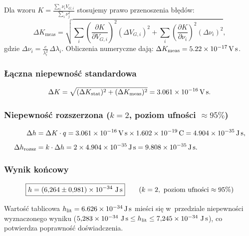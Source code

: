 \documentclass[a4paper,12pt]{article}
\begin{document}
Dla wzoru $K = \frac{\sum_i \nu_i V_{G,i}}{\sum_i \nu_j^2}$ stosujemy prawo przenoszenia błędów:
\begin{equation}
  \Delta K_\text{meas} = \sqrt{
    \sum_i \left(\frac{\partial K}{\partial V_{G,i}}\right)^2 (\Delta V_{G,i})^2 +
    \sum_i \left(\frac{\partial K}{\partial \nu_i}\right)^2  (\Delta\nu_i)^2},
\end{equation}
gdzie $\Delta\nu_i = \frac{c}{\lambda_i^2}\,\Delta\lambda_i$.
Obliczenia numeryczne dają: $\Delta K_\text{meas} = \SI{5{,}22e-17}{V.s}$.

\subsubsection*{Łączna niepewność standardowa}

\begin{equation}
  \Delta K = \sqrt{(\Delta K_\text{stat})^2 + (\Delta K_\text{meas})^2}
           = \SI{3{,}061e-16}{V.s}.
\end{equation}

\subsubsection*{Niepewność rozszerzona ($k = 2$, poziom ufności $\approx 95\%$)}

\begin{align}
  \Delta h &= \Delta K \cdot q = \SI{3{,}061e-16}{V.s} \times \SI{1{,}602e-19}{C}
             = \SI{4{,}904e-35}{J.s}, \notag\\[4pt]
  \Delta h_\text{rozsz} &= k \cdot \Delta h = 2 \times \SI{4{,}904e-35}{J.s}
             = \SI{9{,}808e-35}{J.s}.
\end{align}

\subsubsection*{Wynik końcowy}

\begin{equation}
  \boxed{h = (6{,}264 \pm 0{,}981) \times 10^{-34}\ \text{J\,s}}
  \qquad (k=2,\ \text{poziom ufności} \approx 95\%)
\end{equation}

Wartość tablicowa $h_\text{lit} = \SI{6{,}626e-34}{J.s}$ mieści się w~przedziale
niepewności wyznaczonego wyniku
($5{,}283 \times 10^{-34}\ \text{J\,s} \leq h_\text{lit} \leq 7{,}245 \times 10^{-34}\ \text{J\,s}$),
co potwierdza poprawność doświadczenia.
\end{document}
